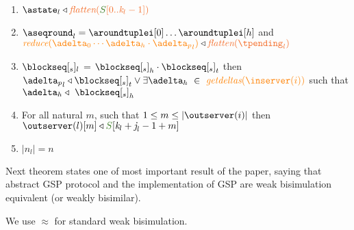 \begin{definition}
\begin{enumerate}
	\item \label{prop_state_known} $\astate_l \triangleleft \flatten {\queuemessage[0 .. \tknown_l - 1]}$
	\item \label{prop_pending} $\pending_l = \aroundtuplei[0]\ldots\aroundtuplei[h]$ and $\ireduce{\adelta_0\cdots\adelta_h\cdot {\pushbuffer}_l} \triangleleft \flatten{\tpending_l}$
	\item \label{prop_send} $\tsent_l$ = ${\tsent}_h \cdot {\tsent}_t $ then $ {\pushbuffer}_l \triangleleft {\tsent}_t \lor \exists \adelta_h\ \in \ \igetdeltas{\inserver(i)}$ such that $\adelta_h \triangleleft \ {\tsent}_h$
	\item \label{prop_outserver} For all natural $m$, such that $1 \leq m \leq |\outserver(i)|$ then $\outserver(l)[m] \triangleleft \queuemessage[\tknown_l + \treceivebuffer_l - 1 + m]$
\item \label{prop_size_buffersent} $|n_l| = n$ 
	

\end{enumerate}
 
	
	
\end{definition}

Next theorem states one of most important result of the paper, saying that abstract GSP protocol and the implementation of GSP are weak bisimulation equivalent (or weakly bisimilar).

We use $\approx$ for standard weak bisimulation.


